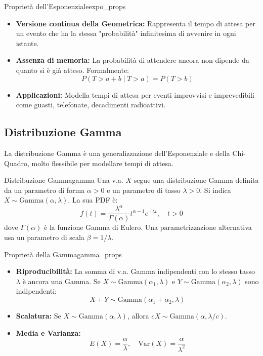\begin{proposizione}{Proprietà dell'Esponenziale}{expo_props}
\begin{itemize}
    \item \textbf{Versione continua della Geometrica:} Rappresenta il tempo di attesa per un evento che ha la stessa "probabilità" infinitesima di avvenire in ogni istante.
    \item \textbf{Assenza di memoria:} La probabilità di attendere ancora non dipende da quanto si è già atteso. Formalmente:
    \[ P(T > a+b \mid T > a) = P(T > b) \]
    \item \textbf{Applicazioni:} Modella tempi di attesa per eventi improvvisi e imprevedibili come guasti, telefonate, decadimenti radioattivi.
\end{itemize}
\end{proposizione}

\subsection{Distribuzione Gamma}
La distribuzione Gamma è una generalizzazione dell'Esponenziale e della Chi-Quadro, molto flessibile per modellare tempi di attesa.

\begin{definizione}{Distribuzione Gamma}{gamma}
Una v.a. \(X\) segue una distribuzione Gamma definita da un parametro di forma \(\alpha>0\) e un parametro di tasso \(\lambda>0\). Si indica \(X \sim \text{Gamma}(\alpha, \lambda)\). La sua PDF è:
\[
f(t) = \frac{\lambda^\alpha}{\Gamma(\alpha)} t^{\alpha-1} e^{-\lambda t}, \quad t>0
\]
dove \(\Gamma(\alpha)\) è la funzione Gamma di Eulero. Una parametrizzazione alternativa usa un parametro di scala \(\beta = 1/\lambda\).
\end{definizione}

\begin{proposizione}{Proprietà della Gamma}{gamma_props}
\begin{itemize}
    \item \textbf{Riproducibilità:} La somma di v.a. Gamma indipendenti con lo stesso tasso \(\lambda\) è ancora una Gamma. Se \(X \sim \text{Gamma}(\alpha_1, \lambda)\) e \(Y \sim \text{Gamma}(\alpha_2, \lambda)\) sono indipendenti:
    \[ X+Y \sim \text{Gamma}(\alpha_1+\alpha_2, \lambda) \]
    \item \textbf{Scalatura:} Se \(X \sim \text{Gamma}(\alpha, \lambda)\), allora \(cX \sim \text{Gamma}(\alpha, \lambda/c)\).
    \item \textbf{Media e Varianza:}
    \[ E(X) = \frac{\alpha}{\lambda}, \quad \text{Var}(X) = \frac{\alpha}{\lambda^2} \]
\end{itemize}
\end{proposizione}

